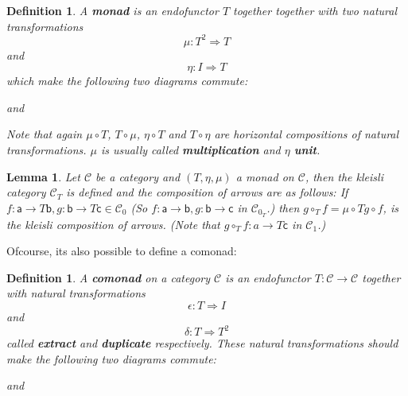 \documentclass{article}
\newcommand{\cat}[1]{\mathcal{#1}} %
\newcommand{\cato}[1]{\cat{#1}_0} %
\newcommand{\catm}[1]{\cat{#1}_1} %
\newcommand{\ob}[1]{\mathsf{#1}} %
\newtheorem{lemma}[theorem]{Lemma}
\newtheorem{definition}[theorem]{Definition}
\begin{document}
\begin{definition}
	A \textbf{monad} is an endofunctor $T$ together together with two natural transformations
	$$ \mu: T^2 \Rightarrow T $$
	and
	$$ \eta: I \Rightarrow T $$
	which make the following two diagrams commute:

	and
	Note that again $\mu \circ T$, $T \circ \mu$, $\eta \circ T$ and $T \circ \eta$ are horizontal compositions of natural transformations.
	$\mu$ is usually called \textbf{multiplication} and $\eta$ \textbf{unit}.
\end{definition}

\begin{lemma}
	Let $\cat{C}$ be a category and $(T, \eta, \mu)$ a monad on $\cat{C}$, then the kleisli category $\cat{C}_T$ is defined and the composition of arrows are as follows:
	If $f: \ob{a} \rightarrow T\ob{b}, g: \ob{b} \rightarrow T\ob{c} \in \cato{C}$ (So $f: \ob{a} \rightarrow \ob{b}, g: \ob{b} \rightarrow \ob{c}$ in $\cato{C}_T$.)
	then $g \circ_T f = \mu \circ Tg \circ f$, is the kleisli composition of arrows. (Note that $g \circ_T f: a \rightarrow T\ob{c}$ in $\catm{C}$.)
\end{lemma}

Ofcourse, its also possible to define a comonad:

\begin{definition}
	A \textbf{comonad} on a category $\cat{C}$ is an endofunctor $T: \cat{C} \rightarrow \cat{C}$ together with natural transformations
	$$ \epsilon: T \Rightarrow I $$
	and
	$$ \delta: T \Rightarrow T^2 $$
	called \textbf{extract} and \textbf{duplicate} respectively.
	These natural transformations should make the following two diagrams commute:

	and
\end{definition}
\end{document}
